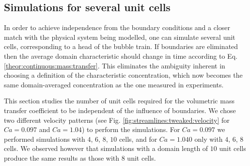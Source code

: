 \documentclass{article}
\begin{document}

\subsection{Simulations for several unit cells}
In order to achieve independence from the boundary conditions and a closer match with
the physical system being modelled, one can simulate several unit cells, corresponding
to a head of the bubble train.  If boundaries are eliminated then the average
domain characteristic should change in time according to Eq.
\ref{theor:continuous:mass:transfer}. This eliminates the ambiguity inherent in choosing a definition
of the characteristic concentration, which now becomes the same domain-averaged concentration
as the one measured in experiments.

This section studies the number of unit cells required for the volumetric
mass transfer coefficient to be independent of the influence of boundaries. We chose two
different
velocity patterns (see Fig. \ref{fig:streamlines:tweaked:velocity} for $Ca=0.097$ and $Ca=1.04$) to
perform the simulations. For $Ca=0.097$ we performed simulations with
$4$, $6$, $8$, $10$ cells, and for $Ca=1.040$ only with $4$, $6$, $8$ cells.
We observed however that simulations with a domain length of $10$ unit cells produce the same results as those with $8$ unit cells.
\end{document}
